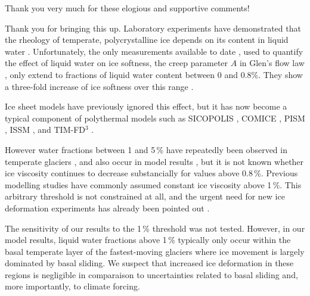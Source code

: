     Thank you very much for these elogious and supportive comments!





    Thank you for bringing this up.
    Laboratory experiments have demonstrated that the rheology of temperate,
    polycrystalline ice depends on its content in liquid water
    \citep[p.~65--66]{Cuffey.Paterson.2010}. Unfortunately, the only
    measurements available to date \citep{Duval.1977}, used to quantify the
    effect of liquid water on ice softness, the creep parameter $A$ in Glen's
    flow law \citep{Lliboutry.Duval.1985}, only extend to fractions of liquid
    water content between 0 and 0.8\%. They show a three-fold increase of ice
    softness over this range \citep[Fig.~1]{Duval.1977}.

    Ice sheet models have previously ignored this effect, but it has now
    become a typical component of polythermal models such as SICOPOLIS
    \citep{Greve.1997}, COMICE \citep{Ruckamp.etal.2010}, PISM
    \citep{Aschwanden.etal.2012}, ISSM \citep{Seroussi.etal.2013}, and
    TIM-FD$\unit{^{3}}$ \citep{Kleiner.Humbert.2014}.

    However water fractions between 1 and 5\,\% have repeatedly been observed
    in temperate glaciers \citep{Murray.etal.2000, Murray.etal.2007,
    Bradford.Harper.2005, Bradford.etal.2009}, and also occur in model results
    \citep[e.g.,][]{Blatter.Greve.2015}, but it is not known whether ice
    viscosity continues to decrease substancially for values above 0.8\,\%.
    Previous modelling studies have commonly assumed constant ice viscosity
    above 1\,\%. This arbitrary threshold is not constrained at all, and the
    urgent need for new ice deformation experiments has already been pointed
    out \citep{Kleiner.etal.2015}.

    The sensitivity of our results to the 1\,\% threshold was not tested.
    However, in our model results, liquid water fractions above 1\,\% typically
    only occur within the basal temperate layer of the fastest-moving glaciers
    where ice movement is largely dominated by basal sliding. We suspect that
    increased ice deformation in these regions is negligible in comparaison to
    uncertainties related to basal sliding and, more importantly, to climate 
    forcing.

